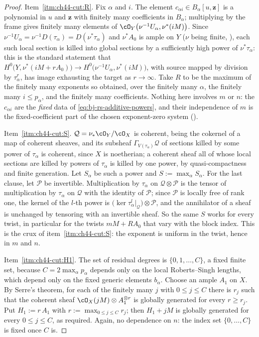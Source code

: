 \begin{proof}
Item~\cref{itm:ch44-cut:R}.  Fix $\alpha$ and $i$.  The element
$c_{\alpha i}\in B_\alpha[u,\mathbf z]$ is a polynomial in $u$ and
$\mathbf z$ with finitely many coefficients in $B_\alpha$; multiplying by
the frame gives finitely many elements of
$\cO_Y\bigl(\nu^{-1}U_\alpha,\nu^*(iM)\bigr)$.  Since
$\nu^{-1}U_\alpha=\nu^{-1}D(\tau_\alpha)=D(\nu^*\tau_\alpha)$ and
$\nu^*A_0$ is ample on $Y$ ($\nu$ being finite,
), each such local section is killed into
global sections by a sufficiently high power of $\nu^*\tau_\alpha$: this
is the standard statement that
$H^0\bigl(Y,\nu^*(iM+rA_0)\bigr)\to
 H^0\bigl(\nu^{-1}U_\alpha,\nu^*(iM)\bigr)$,
with source mapped by division by $\tau_\alpha^r$, has image exhausting
the target as $r\to\infty$.  Take $R$ to be the maximum of the finitely
many exponents so obtained, over the finitely many $\alpha$, the finitely
many $i\le p_\alpha$, and the finitely many coefficients.  Nothing here
involves $m$ or $n$: the $c_{\alpha i}$ are the \emph{fixed} data of
\eqref{eq:bj-rs-additive-powers}, and their independence of $m$ is
the fixed-coefficient part of the chosen exponent-zero system
().

Item~\cref{itm:ch44-cut:S}.  $\mathcal Q=\nu_*\cO_Y/\cO_X$ is coherent,
being the cokernel of a map of coherent sheaves, and its subsheaf
$\Gamma_{V(\tau_\alpha)}\mathcal Q$ of sections killed by some power of
$\tau_\alpha$ is coherent, since $X$ is noetherian; a coherent sheaf all
of whose local sections are killed by powers of $\tau_\alpha$ is killed by
one power, by quasi-compactness and finite generation.  Let $S_\alpha$ be
such a power and $S:=\max_\alpha S_\alpha$.  For the last clause, let
$\mathcal P$ be invertible.  Multiplication by $\tau_\alpha$ on
$\mathcal Q\otimes\mathcal P$ is the tensor of multiplication by
$\tau_\alpha$ on $\mathcal Q$ with the identity of $\mathcal P$; since
$\mathcal P$ is locally free of rank one, the kernel of the $l$-th power
is $\bigl(\ker\tau_\alpha^l|_{\mathcal Q}\bigr)\otimes\mathcal P$, and the
annihilator of a sheaf is unchanged by tensoring with an invertible sheaf.
So the same $S$ works for every twist, in particular for the twists
$mM+RA_0$ that vary with the block index.  This is the crux of
item~\cref{itm:ch44-cut:S}: the exponent is uniform in the twist, hence
in $m$ and $n$.

Item~\cref{itm:ch44-cut:H1}.  The set of residual degrees is
$\{0,1,\ldots,C\}$, a fixed finite set, because $C=2\max_\alpha p_\alpha$
depends only on the local Roberts--Singh lengths, which depend only on the
fixed generic elements $b_\alpha$.  Choose an ample $A_1$ on $X$.  By
Serre's theorem, for each of the finitely many $j$ with $0\le j\le C$
there is $r_j$ such that the coherent sheaf $\cO_X(jM)\otimes
A_1^{\otimes r}$ is globally generated for every $r\ge r_j$.  Put
$H_1:=r\,A_1$ with $r:=\max_{0\le j\le C}r_j$; then $H_1+jM$ is
globally generated for every $0\le j\le C$, as required.  Again, no
dependence on $n$: the index set $\{0,\ldots,C\}$ is fixed once $C$
is.
\end{proof}

